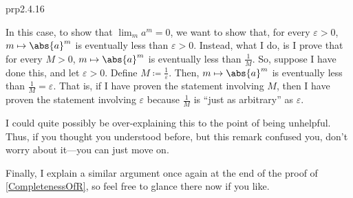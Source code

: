 \begin{prp}{}{prp2.4.16}
\begin{rmk}
In this case, to show that $\lim _ma^m=0$, we want to show that, for every $\varepsilon >0$, $m\mapsto \abs{a}^m$ is eventually less than $\varepsilon >0$.  Instead, what I do, is I prove that for every $M>0$, $m\mapsto \abs{a}^m$ is eventually less than $\frac{1}{M}$.  So, suppose I have done this, and let $\varepsilon >0$.  Define $M\coloneqq \frac{1}{\varepsilon}$.  Then, $m\mapsto \abs{a}^m$ is eventually less than $\frac{1}{M}=\varepsilon$.  That is, if I have proven the statement involving $M$, then I have proven the statement involving $\varepsilon$ because $\frac{1}{M}$ is ``just as arbitrary'' as $\varepsilon$.

I could quite possibly be over-explaining this to the point of being unhelpful.  Thus, if you thought you understood before, but this remark confused you, don't worry about it---you can just move on.

Finally, I explain a similar argument once again at the end of the proof of \cref{CompletenessOfR}, so feel free to glance there now if you like.
\end{rmk}
\end{prp}

